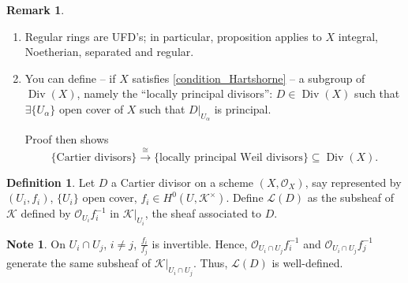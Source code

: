 \documentclass[12pt]{article}
\DeclareMathOperator{\Div}{Div}
\theoremstyle{definition}
\newtheorem*{definition}{Definition}
\newtheorem*{remark}{Remark}
\newtheorem*{note}{Note}
\theoremstyle{remark}
\newtheorem*{comment}{Comment}
\begin{document}
\begin{remark}
\begin{enumerate}[label=\arabic*)]
\item Regular rings are UFD's; in particular, proposition applies to $X$ integral, Noetherian, separated and regular.

\item You can define -- if $X$ satisfies \eqref{condition_Hartshorne} -- a subgroup of $\Div(X)$, namely the ``locally principal divisors'': $D\in\Div(X)$ such that $\exists\{U_{\alpha}\}$ open cover of $X$ such that $D|_{U_{\alpha}}$ is principal.

Proof then shows
\[\{\text{Cartier divisors}\}\overset{\cong}{\longrightarrow}\{\text{locally principal Weil divisors}\}\subseteq\Div(X).\]
\end{enumerate}
\end{remark}

\begin{comment}
Remember the Picard group, formed by invertible modules, i.e., locally free of rank 1. The inverse element is the dual module, as these modules -- like finitely dimensional vector spaces -- are canonically isomorphic to their bidual.
\end{comment}

\begin{definition}
Let $D$ a Cartier divisor on a scheme $(X,\mathcal{O}_X)$, say represented by $(U_i,f_i)$, $\{U_i\}$ open cover, $f_i\in H^0(U,\mathcal{K}^{\times})$. Define $\mathcal{L}(D)$ as the subsheaf of $\mathcal{K}$ defined by $\mathcal{O}_{U_i}f_i^{-1}$ in $\mathcal{K}|_{U_i}$, the sheaf associated to $D$.
\end{definition}

\begin{note}
On $U_i\cap U_j$, $i\neq j$, $\frac{f_i}{f_j}$ is invertible. Hence, $\mathcal{O}_{U_i\cap U_j}f_i^{-1}$ and $\mathcal{O}_{U_i\cap U_j}f_j^{-1}$ generate the same subsheaf of $\mathcal{K}|_{U_i\cap U_j}$. Thus, $\mathcal{L}(D)$ is well-defined.
\end{note}
\end{document}
